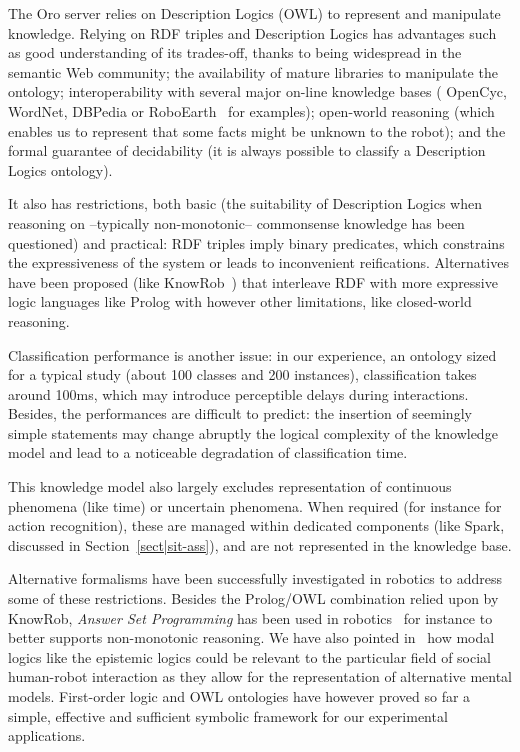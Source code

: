 \documentclass[preprint,3p,times]{elsarticle}
\begin{document}
The {\sc Oro} server relies on Description Logics (OWL) to represent and
manipulate knowledge. Relying on RDF triples and Description Logics has advantages such as good
understanding of its trades-off, thanks to being widespread in the semantic Web
community; the availability of mature libraries to manipulate the ontology;
interoperability with several major on-line knowledge bases ({\sc
OpenCyc}, {\sc WordNet}, {\sc DBPedia} or {\sc RoboEarth}~\cite{Waibel2011} for
examples); open-world reasoning (which enables us to represent that some facts
might be unknown to the robot); and the formal guarantee of decidability
(it is always possible to classify a Description Logics ontology).

It also has restrictions, both basic (the suitability of
Description Logics when reasoning on --typically non-monotonic-- commonsense
knowledge has been questioned) and practical: RDF triples imply binary
predicates, which constrains the expressiveness of the system or leads to
inconvenient reifications. Alternatives have been proposed (like {\sc
KnowRob}~\cite{Tenorth2009a}) that interleave RDF with more expressive logic languages
like {\sc Prolog} with however other limitations, like closed-world reasoning.

Classification performance is another issue: in our experience, an
ontology sized for a typical study (about 100 classes and 200 instances),
classification takes around 100ms, which may introduce perceptible delays during
interactions.  Besides, the performances are difficult to predict: the insertion
of seemingly simple statements may change abruptly the logical
complexity of the knowledge model and lead to a noticeable degradation of
classification time.

This knowledge model also largely excludes representation of continuous
phenomena (like time) or uncertain phenomena. When required (for instance for
action recognition), these are managed within dedicated components (like {\sc
Spark}, discussed in Section~\ref{sect|sit-ass}), and are not represented in the
knowledge base.

Alternative formalisms have been successfully investigated in robotics to
address some of these restrictions. Besides the Prolog/OWL combination relied
upon by {\sc KnowRob}, \emph{Answer Set Programming} has been
used in robotics~\cite{Chen2010,Erdem2012} for instance to better supports non-monotonic
reasoning. We have also pointed in~\cite{lemaignan2015mutual} how modal logics like
the epistemic logics could be relevant to the particular field of social
human-robot interaction as they allow for the representation of
alternative mental models. First-order logic and OWL ontologies have however
proved so far a simple, effective and sufficient symbolic framework for our
experimental applications. 
\end{document}
